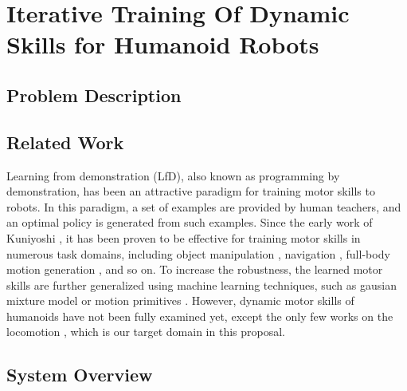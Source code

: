 \section{Iterative Training Of Dynamic Skills for Humanoid Robots}


\subsection{Problem Description}

\subsection{Related Work}

Learning from demonstration (LfD), also known as programming by demonstration,
has been an attractive paradigm for training motor skills to robots.
In this paradigm, a set of examples are provided by human teachers,
and an optimal policy is generated from such examples.
Since the early work of Kuniyoshi \etal \cite{kuniyoshi:1989:TBS},
it has been proven to be effective for training motor skills in
numerous task domains, including object manipulation 
\cite{Atkeson:1997:RLD,Calinon:2007:LRG,Ueda:2010:MNH},
navigation \cite{Konidaris:2011:RLD}, 
full-body motion generation \cite{Kulic:2011:ILF}, and so on.
To increase the robustness, the learned motor skills are further 
generalized using machine learning techniques,
such as gausian mixture model \cite{Calinon:2007:LRG} or
motion primitives \cite{Pastor:2009:LGM}.
However, dynamic motor skills of humanoids have
not been fully examined yet, except the only few works on the
locomotion \cite{Nakanishi:2004:LDA}, which is our target domain
in this proposal.

\subsection{System Overview}
